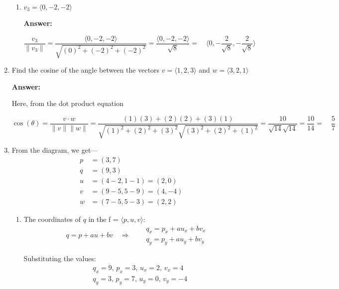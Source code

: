\documentclass{article}
\newcommand{\vect}[1]{\langle #1 \rangle}
\begin{document}
\begin{enumerate}
\begin{enumerate}
  \item $v_3 = \vect{0,-2,-2}$

\vspace{1em}
\textbf{Answer: }

\begin{equation}
    \frac{v_3}{\|v_3\|}
    = \frac{\vect{0, -2, -2}}{\sqrt{(0)^2 + (-2)^2 + (-2)^2}}
    = \frac{\vect{0, -2, -2}}{\sqrt{8}}
    = \quad \boxed{\vect{0, -\frac{2}{\sqrt{8}}, -\frac{2}{\sqrt{8}}}}
\end{equation}

  \end{enumerate}

\item Find the cosine of the angle between the vectors
  $v=\vect{1,2,3}$ and $w=\vect{3,2,1}$
  
\vspace{1em}
\textbf{Answer: }

Here, from the dot product equation

\begin{equation}
\cos(\theta) = \frac{v \cdot w}{\|v\| \|w\|} 
= \frac{(1)(3) + (2)(2) + (3)(1)}{\sqrt{(1)^2 + (2)^2 + (3)^2} \sqrt{(3)^2 + (2)^2 + (1)^2}}
= \frac{10}{\sqrt{14} \sqrt{14}} 
= \frac{10}{14} 
= \quad \boxed{\frac{5}{7}}
\end{equation}



    \newpage
  \item 
  
    From the diagram, we get—
\begin{align*}
p &= (3, 7) \\
q &= (9, 3) \\
u &= (4 - 2, 1 - 1) = (2, 0) \\
v &= (9 - 5, 5 - 9) = (4, -4) \\
w &= (7 - 5, 5 - 3) = (2, 2)
\end{align*}
    \begin{enumerate}
      \item The coordinates of $q$ in the f = $\langle p, u, v \rangle$:
        \[
        q = p + a u + b v \quad \Rightarrow \quad 
        \begin{aligned}
            &q_x = p_x + a u_x + b v_x  \\
            &q_y = p_y + a u_y + b v_y
        \end{aligned}
        \]

        Substituting the values:
\[
\begin{aligned}
    &q_x = 9, \, p_x = 3, \, u_x = 2, \, v_x = 4 \\
    &q_y = 3, \, p_y = 7, \, u_y = 0, \, v_y = -4
\end{aligned}
\]


\end{enumerate}
\end{enumerate}
\end{document}
